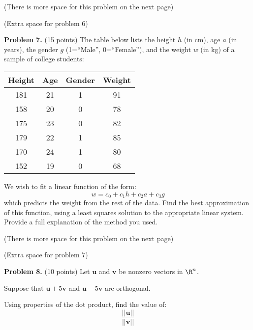 \documentclass[12pt]{article}
\begin{document}
\vfill

(There is more space for this problem on the next page)

\clearpage

(Extra space for problem 6)

\clearpage

\textbf{Problem 7.} (15 points) The table below lists the height $h$ (in cm), age $a$ (in years), the gender $g$ (1=``Male'', 0=``Female''), and the weight $w$ (in kg) of a sample of college students:

\begin{center}
\begin{tabular}{c|c|c|c}
Height & Age & Gender & Weight\\\hline
181 & 21 & 1 & 91\\
158 & 20 & 0 & 78\\
175 & 23 & 0 & 82\\
179 & 22 & 1 & 85\\
170 & 24 & 1 & 80\\
152 & 19 & 0 & 68\\
\end{tabular}
\end{center}

We wish to fit a linear function of the form:
\[
w=c_0+c_1h+c_2a+c_3g
\]
which predicts the weight from the rest of the data. Find the best approximation of this function, using a least squares solution to the appropriate linear system. Provide a full explanation of the method you used.

\vfill

(There is more space for this problem on the next page)

\clearpage

(Extra space for problem 7)

\clearpage

\textbf{Problem 8.} (10 points) Let $\mathbf{u}$ and $\mathbf{v}$ be nonzero vectors in $\R^n$.

Suppose that $\mathbf{u}+5\mathbf{v}$ and $\mathbf{u}-5\mathbf{v}$ are orthogonal.

Using properties of the dot product, find the value of:
\[
\frac{||\mathbf{u}||}{||\mathbf{v}||}
\]
\end{document}
